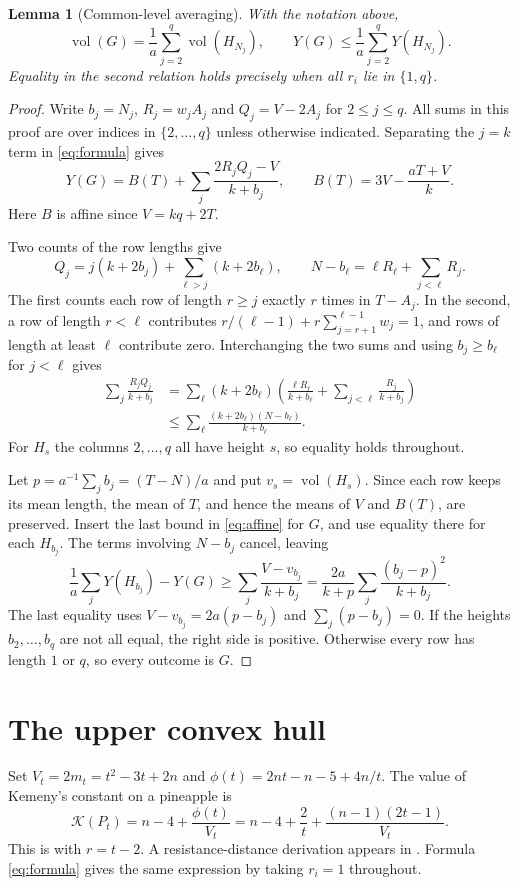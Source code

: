 \documentclass[11pt]{amsart}
\newtheorem{lemma}[theorem]{Lemma}
\numberwithin{equation}{section}
\newcommand{\K}{\mathcal K}
\DeclareMathOperator{\vol}{vol}
\begin{document}
\begin{lemma}[Common-level averaging]\label{lem:average}
With the notation above,
\[
 \vol(G)=\frac1a\sum_{j=2}^q \vol(H_{N_j}),\qquad
 Y(G)\le\frac1a\sum_{j=2}^q Y(H_{N_j}).
\]
Equality in the second relation holds precisely when all $r_i$ lie in
$\{1,q\}$.
\end{lemma}
\begin{proof}
Write $b_j=N_j$, $R_j=w_jA_j$ and $Q_j=V-2A_j$ for $2\le j\le q$.
All sums in this proof are over indices in $\{2,\ldots,q\}$ unless
otherwise indicated.
Separating the $j=k$ term in \eqref{eq:formula} gives
\begin{equation}\label{eq:affine}
 Y(G)=B(T)+\sum_j\frac{2R_jQ_j-V}{k+b_j},\qquad
 B(T)=3V-\frac{aT+V}{k}.
\end{equation}
Here $B$ is affine since $V=kq+2T$.

Two counts of the row lengths give
\[
 Q_j=j(k+2b_j)+\sum_{\ell>j}(k+2b_\ell),\qquad
 N-b_\ell=\ell R_\ell+\sum_{j<\ell}R_j.
\]
The first counts each row of length $r\ge j$ exactly $r$ times in
$T-A_j$. In the second, a row of length $r<\ell$ contributes
$r/(\ell-1)+r\sum_{j=r+1}^{\ell-1}w_j=1$, and rows of length at least $\ell$ contribute zero.
Interchanging the two sums and using $b_j\ge b_\ell$ for $j<\ell$ gives
\begin{align*}
 \sum_j\frac{R_jQ_j}{k+b_j}
 &=\sum_\ell(k+2b_\ell)\left(\frac{\ell R_\ell}{k+b_\ell}
                   +\sum_{j<\ell}\frac{R_j}{k+b_j}\right)\\
 &\le\sum_\ell\frac{(k+2b_\ell)(N-b_\ell)}{k+b_\ell}.
\end{align*}
For $H_s$ the columns $2,\ldots,q$ all have height $s$, so equality
holds throughout.

Let $p=a^{-1}\sum_j b_j=(T-N)/a$ and put $v_s=\vol(H_s)$.
Since each row keeps its mean length, the mean of $T$, and hence the
means of $V$ and $B(T)$, are preserved.
Insert the last bound in \eqref{eq:affine} for $G$, and use equality
there for each $H_{b_j}$. The terms involving $N-b_j$ cancel, leaving
\[
 \frac1a\sum_jY(H_{b_j})-Y(G)
 \ge \sum_j\frac{V-v_{b_j}}{k+b_j}
 =\frac{2a}{k+p}\sum_j\frac{(b_j-p)^2}{k+b_j}.
\]
The last equality uses $V-v_{b_j}=2a(p-b_j)$ and $\sum_j(p-b_j)=0$.
If the heights $b_2,\ldots,b_q$ are not all equal, the right side is positive.
Otherwise every row has length $1$ or $q$, so every outcome is $G$.
\end{proof}

\section{The upper convex hull}\label{sec:polygon}
Set $V_t=2m_t=t^2-3t+2n$ and $\phi(t)=2nt-n-5+4n/t$.
The value of Kemeny's constant on a pineapple is
\begin{equation}\label{eq:pine}
 \K(P_t)=n-4+\frac{\phi(t)}{V_t}
         =n-4+\frac2t+\frac{(n-1)(2t-1)}{V_t}.
\end{equation}
This is \cite[Lemma 3.14]{Breen} with $r=t-2$. A resistance-distance
derivation appears in \cite[Corollary 3.5]{HC}. Formula
\eqref{eq:formula} gives the same expression by taking $r_i=1$ throughout.
\end{document}
